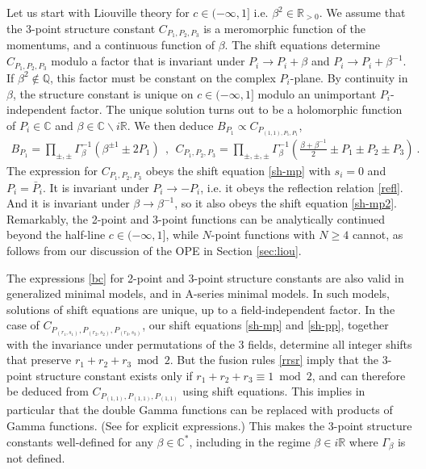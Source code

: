 \documentclass[12pt, a4paper]{article}
\theoremstyle{break}
\begin{document}
Let us start with Liouville theory for $c\in (-\infty ,1]$ i.e. $\beta^2\in\mathbb{R}_{>0}$. 
We assume that the 3-point structure constant $C_{P_1,P_2,P_3}$ is a meromorphic function of the momentums, and a continuous function of $\beta$. 
The shift equations determine $C_{P_1,P_2,P_3}$ modulo a factor that is invariant under $P_i\to P_i+\beta$ and $P_i\to P_i+\beta^{-1}$. 
If $\beta^2\notin \mathbb{Q}$, this factor must be constant on the complex $P_i$-plane. By continuity in $\beta$, the structure constant is unique on $c\in (-\infty,1]$ modulo an unimportant $P_i$-independent factor. The unique solution turns out to be a holomorphic function of $P_i\in\mathbb{C}$ and $\beta\in \mathbb{C}\backslash i\mathbb{R}$. We then deduce $B_{P_1}\propto C_{P_{(1,1),P_1,P_1}}$,
\begin{align}
 \boxed{B_{P_1} = \prod_{\pm,\pm}\Gamma_\beta^{-1}\left(\beta^{\pm 1}\pm 2P_1\right)} 
  \ \  , \ \
  \boxed{C_{P_1,P_2,P_3} =\prod_{\pm,\pm,\pm} \Gamma_\beta^{-1}\left(\tfrac{\beta+\beta^{-1}}{2} \pm P_1\pm P_2\pm P_3\right)}
 \ . 
 \label{bc}
\end{align}
The expression for $C_{P_1,P_2,P_3}$ obeys the shift equation \eqref{sh-mp} with $s_i=0$ and $P_i=\bar P_i$.
It is invariant under $P_i\to -P_i$, i.e. it obeys the reflection relation \eqref{refl}.
And it is invariant under $\beta \to \beta^{-1}$, so it also obeys the shift equation \eqref{sh-mp2}. 
Remarkably, the 2-point and 3-point functions can be analytically continued beyond the half-line $c\in (-\infty ,1]$, while $N$-point functions with $N\geq 4$ cannot, as follows from our discussion of the OPE in Section \ref{sec:liou}. 

The expressions \eqref{bc} for 2-point and 3-point structure constants are also valid in generalized minimal models, and in A-series minimal models. In such models, solutions of shift equations are unique, up to a field-independent factor. In the case of $C_{P_{(r_1,s_1)},P_{(r_2,s_2)},P_{(r_3,s_3)}}$, our shift equations \eqref{sh-mp} and \eqref{sh-pp}, together with the invariance under permutations of the 3 fields, determine all integer shifts that preserve $r_1+r_2+r_3\bmod 2$. But the fusion rules \eqref{rrsr} imply that the 3-point structure constant exists only if $r_1+r_2+r_3\equiv 1\bmod 2$, and can therefore be deduced from $C_{P_{(1,1)},P_{(1,1)},P_{(1,1)}}$ using shift equations. This implies in particular that the double Gamma functions can be replaced with products of Gamma functions. (See \cite[Section 3.2.1]{rib14} for explicit expressions.) This makes the 3-point structure constants well-defined for any $\beta\in \mathbb{C}^*$, including in the regime $\beta\in i\mathbb{R}$ where $\Gamma_\beta$ is not defined.
\end{document}
